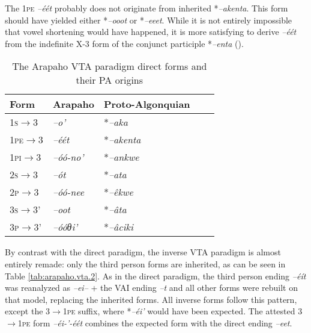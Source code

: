 \documentclass[twoside,a4paper,11pt]{article}
\newcommand{\ipa}[1]{{\phon\textit{#1}}}
\newcommand{\grise}[1]{\cellcolor{lightgray}\textbf{#1}}
\newcommand{\Σ}{\greek{Σ}}
\begin{document}
The \textsc{1pe} \ipa{--éét} probably does not originate from inherited  *\ipa{--akenta}. This form should have yielded  either *\ipa{--ooot} or *\ipa{--eeet}. While it is not entirely impossible that vowel shortening would have happened, it is more satisfying to derive  \ipa{--éét}  from the indefinite X-3 form of the conjunct participle  *\ipa{--enta} (\citealt{goddard98morphology.arapaho}).

\begin{table}[H]
\caption{The Arapaho VTA paradigm direct forms and their PA origins}
\centering \label{tab:arapaho.vta.1}
\begin{tabular}{lllll}
\toprule
Form& Arapaho & Proto-Algonquian \\
\midrule
 \textsc{1s}$\rightarrow$3 & 	\ipa{--o'} & 	*\ipa{--aka} & 		\\		
\textsc{1pe}$\rightarrow$3 & 	\ipa{--éét} & 	\grise{} *\ipa{--akenta} & 		\\		
\textsc{1pi}$\rightarrow$3 & 	\ipa{--óó-no'} & \grise{}*\ipa{--ankwe} & 		\\		
\midrule
\textsc{2s}$\rightarrow$3 & 	\ipa{--ót} & 	*\ipa{--ata} & 		\\		
\textsc{2p}$\rightarrow$3 & 	\ipa{--óó-nee} & \grise{}*\ipa{--êkwe} & 		\\		
\midrule
\textsc{3s}$\rightarrow$3' & 	\ipa{--oot} & 	*\ipa{--âta} & 		\\		
\textsc{3p}$\rightarrow$3' & 	\ipa{--óóθi'} & 	*\ipa{--âciki} & 		\\		
\bottomrule
\end{tabular}
\end{table}

By contrast with the direct paradigm, the inverse   VTA paradigm is almost entirely remade: only the third person forms are inherited, as can be seen in Table \ref{tab:arapaho.vta.2}. As in the direct paradigm, the third person ending \ipa{--éít} was reanalyzed as \ipa{--ei--} + the VAI ending \ipa{--t} and all other forms were rebuilt on that model, replacing the inherited forms. All inverse forms follow this pattern, except the \textsc{3$\rightarrow$1pe} suffix, where *\ipa{--éi'} would have been expected. The attested \textsc{3$\rightarrow$1pe} form \ipa{--éi-'-éét} combines the expected form with the direct ending \ipa{--eet}.
\end{document}
